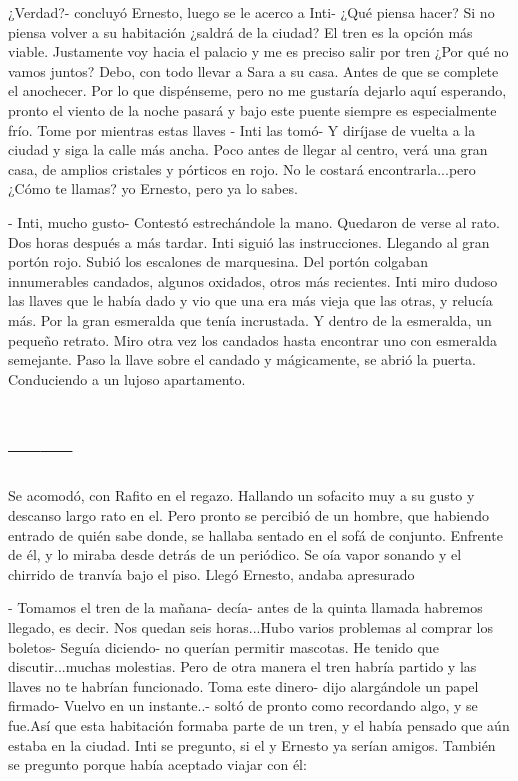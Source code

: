 ¿Verdad?- concluyó Ernesto, luego se le acerco a Inti- ¿Qué piensa hacer? Si no piensa volver a su habitación ¿saldrá de la ciudad? El tren es la opción más viable. Justamente voy hacia el palacio y me es preciso salir por tren ¿Por qué no vamos juntos? Debo, con todo llevar a Sara a su casa. Antes de que se complete el anochecer. Por lo que dispénseme, pero no me gustaría dejarlo aquí esperando, pronto el viento de la noche pasará y bajo este puente siempre es especialmente frío. Tome por mientras estas llaves - Inti las tomó- Y diríjase de vuelta a la ciudad y siga la calle más ancha. Poco antes de llegar al centro, verá una gran casa, de amplios cristales y pórticos en rojo. No le costará encontrarla...pero ¿Cómo te llamas? yo Ernesto, pero ya lo sabes.

- Inti, mucho gusto- Contestó estrechándole la mano. Quedaron de verse al rato. Dos horas después a más tardar.
Inti siguió las instrucciones. Llegando al gran portón rojo. Subió los escalones de marquesina. Del portón colgaban innumerables candados, algunos oxidados, otros más recientes. Inti miro dudoso las llaves que le había dado y vio que una era más vieja que las otras, y relucía más. Por la gran esmeralda que tenía incrustada. Y dentro de la esmeralda, un pequeño retrato. Miro otra vez los candados hasta encontrar uno con esmeralda semejante. Paso la llave sobre el candado y mágicamente, se abrió la puerta. Conduciendo a un lujoso apartamento.



\chapter{------}
Se acomodó, con Rafito en el regazo. Hallando un sofacito muy a su gusto y descanso largo rato en el. Pero pronto se percibió de un hombre, que habiendo entrado de quién sabe donde, se hallaba sentado en el sofá de conjunto. Enfrente de él, y lo miraba desde detrás de un periódico. Se oía vapor sonando y el chirrido de tranvía bajo el piso. Llegó Ernesto, andaba apresurado

- Tomamos el tren de la mañana- decía- antes de la quinta llamada habremos llegado, es decir. Nos quedan seis horas...Hubo varios problemas al comprar los boletos- Seguía diciendo- no querían permitir mascotas. He tenido que discutir...muchas molestias. Pero de otra manera el tren habría partido y las llaves no te habrían funcionado. Toma este dinero- dijo alargándole un papel firmado- Vuelvo en un instante..- soltó de pronto como recordando algo, y se fue.Así que esta habitación formaba parte de un tren, y el había pensado que aún estaba en la ciudad. Inti se pregunto, si el y Ernesto ya serían amigos. También se pregunto porque había aceptado viajar con él:

